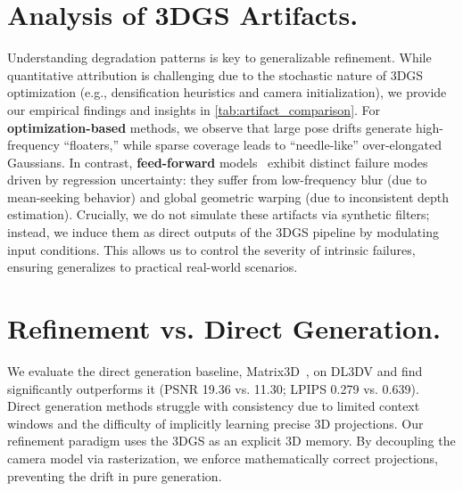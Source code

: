 \section{Analysis of 3DGS Artifacts.} 
\label{supp:3dgs_artifact}
Understanding degradation patterns is key to generalizable refinement. While quantitative attribution is challenging due to the stochastic nature of 3DGS optimization (e.g., densification heuristics and camera initialization), we provide our empirical findings and insights in \cref{tab:artifact_comparison}. For \textbf{optimization-based} methods, we observe that large pose drifts generate high-frequency ``floaters,'' while sparse coverage leads to ``needle-like'' over-elongated Gaussians. 
In contrast, \textbf{feed-forward} models~\cite{xu2024depthsplat,chen2024mvsplat} exhibit distinct failure modes driven by regression uncertainty: they suffer from low-frequency blur (due to mean-seeking behavior) and global geometric warping (due to inconsistent depth estimation). Crucially, we do not simulate these artifacts via synthetic filters; instead, we induce them as direct outputs of the 3DGS pipeline by modulating input conditions. This allows us to control the severity of intrinsic failures, ensuring \ours generalizes to practical real-world scenarios.

\begin{table}[h]
\centering
\caption{\textbf{Empirical Analysis of Artifacts in 3DGS.}}
\label{tab:artifact_comparison}
\end{table}


\section{Refinement vs. Direct Generation.} 
\label{supp:refinement_vs_generation}
We evaluate the direct generation baseline, Matrix3D~\cite{lu2025matrix3d}, on DL3DV and find \ours significantly outperforms it (PSNR 19.36 vs. 11.30; LPIPS  0.279 vs. 0.639). Direct generation methods struggle with consistency due to limited context windows and the difficulty of implicitly learning precise 3D projections. Our refinement paradigm uses the 3DGS as an explicit 3D memory. By decoupling the camera model via rasterization, we enforce mathematically correct projections, preventing the drift in pure generation. 

